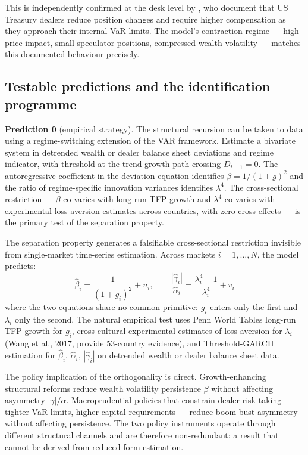 \documentclass[12pt,a4paper]{article}
\theoremstyle{definition}
\begin{document}
This is independently confirmed at the desk level by \citet{li2025}, who document that US Treasury dealers reduce position
changes and require higher compensation as they approach their internal
VaR limits. The model's contraction regime --- high price impact, small
speculator positions, compressed wealth volatility --- matches this
documented behaviour precisely.

\subsection{Testable predictions and the identification programme}
\label{sec:predictions}

\noindent\textbf{Prediction 0} (empirical strategy). The structural
recursion can be taken to data using a regime-switching extension of the
\citet{hasbrouck1991} VAR framework. Estimate a bivariate system in
detrended wealth or dealer balance sheet deviations and regime indicator,
with threshold at the trend growth path crossing $D_{t-1} = 0$. The
autoregressive coefficient in the deviation equation identifies
$\beta = 1/(1+g)^2$ and the ratio of regime-specific innovation variances
identifies $\lambda^4$. The cross-sectional restriction --- $\beta$
co-varies with long-run TFP growth and $\lambda^4$ co-varies with
experimental loss aversion estimates across countries, with zero
cross-effects --- is the primary test of the separation property.

The separation property generates a falsifiable cross-sectional
restriction invisible from single-market time-series estimation. Across
markets $i = 1, \ldots, N$, the model predicts:
\begin{equation}
  \hat{\beta}_i = \frac{1}{(1+g_i)^2} + u_i, \qquad
  \frac{|\hat{\gamma}_i|}{\hat{\alpha}_i}
    = \frac{\lambda_i^4 - 1}{\lambda_i^4} + v_i
  \label{eq:cross_sectional}
\end{equation}
where the two equations share no common primitive: $g_i$ enters only
the first and $\lambda_i$ only the second. The natural empirical test
uses Penn World Tables long-run TFP growth for $g_i$, cross-cultural
experimental estimates of loss aversion for $\lambda_i$ (Wang et al.,
2017, provide 53-country evidence), and Threshold-GARCH estimation for
$\hat{\beta}_i$, $\hat{\alpha}_i$, $|\hat{\gamma}_i|$ on detrended
wealth or dealer balance sheet data.

The policy implication of the orthogonality is direct. Growth-enhancing
structural reforms reduce wealth volatility persistence $\beta$ without
affecting asymmetry $|\gamma|/\alpha$. Macroprudential policies that
constrain dealer risk-taking --- tighter VaR limits, higher capital
requirements --- reduce boom-bust asymmetry without affecting persistence.
The two policy instruments operate through different structural channels
and are therefore non-redundant: a result that cannot be derived from
reduced-form estimation.
\end{document}
